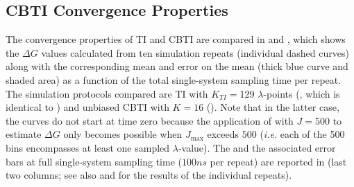 \subsection{CBTI Convergence Properties}

The convergence properties of TI and CBTI are compared in  and ,
which shows the $\Delta G$ values calculated from ten simulation 
repeats (individual dashed curves) along with the corresponding
mean and error  on the mean (thick blue curve and shaded area) 
as a function of the total single-system sampling time per repeat.
%
The simulation protocols compared are TI with $K_{TI}=$129 $\lambda$-points 
(, which is identical to ) 
and unbiased CBTI with $K=16$ ().
%
Note that in the latter case, the curves do not start at time zero
because the application of  with $J=500$ to estimate 
$\Delta G$ only becomes possible when $J_{\mathrm{max}}$ exceeds $500$
({\em i.e.} each of the 500 bins encompasses at least
one sampled $\lambda$-value).
%
The  and the associated error bars at full
single-system sampling time ($100\unit{ns}$ per repeat) are 
reported in  (last two columns;
see also  and  for the results
of the individual repeats).
%

